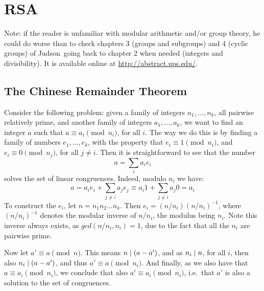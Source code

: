 
\chapter{RSA}
\label{cha:rsa}

Note: if the reader is unfamiliar with modular arithmetic and/or group theory, he could do worse than to check chapters 3 (groups and subgroups) and 4 (cyclic groups) of Judson~\cite{Judson:AbstractAlgebra}\emd going back to chapter 2 when needed (integers and divisibility). It is available online at \url{http://abstract.ups.edu/}.

\section{The Chinese Remainder Theorem}
  \label{sec:CRT}
  Consider the following problem: given a family of integers $n_1, \dots, n_k$, all pairwise relatively prime, and another family of integers $a_1, \dots, a_k$, we want to find an integer $a$ such that $a \equiv a_i \pmod{n_i}$, for all $i$. The way we do this is by finding a family of numbers $e_1, \dots, e_k$, with the property that $e_i \equiv 1 \pmod{n_i}$, and $e_i \equiv 0 \pmod{n_j}$, for all $j\neq i$. Then it is straightforward to see that the number
  \begin{equation}
    a = \sum_{i} a_ie_i
  \end{equation}
  solves the set of linear congruences. Indeed, modulo $n_i$ we have:
  \begin{equation}
    a = a_ie_i + \sum_{j\neq i} a_je_j \equiv a_i1 + \sum_{j\neq i} a_j0 = a_i
  \end{equation}
  To construct the $e_i$, let $n = n_1n_2\dots n_k$. Then $e_i = (n/n_i)(n/n_i)^{-1}$, where $(n/n_i)^{-1}$ denotes the modular inverse of $n/n_i$, the modulus being $n_i$. Note this inverse always exists, as $gcd(n/n_i, n_i) = 1$, due to the fact that all the $n_i$ are pairwise prime.

  Now let $a' \equiv a \pmod{n}$. This means $n\mathrel{|} (a-a')$, and as $n_i\mathrel{|} n$, for all $i$, then also $n_i\mathrel{|} (a-a')$, and thus $a' \equiv a \pmod{n_i}$. And finally, as we also have that $a \equiv a_i \pmod{n_i}$, we conclude that also $a' \equiv a_i \pmod{n_i}$, i.e.\ that $a'$ is also a solution to the set of congruences.

